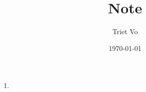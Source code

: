 \documentclass[12pt, letterpaper]{article}
\title{Note}
\author{Triet Vo}
\date{\today}
\begin{document}
\maketitle

\begin{enumerate}
\item
\end{enumerate}
\end{document}
